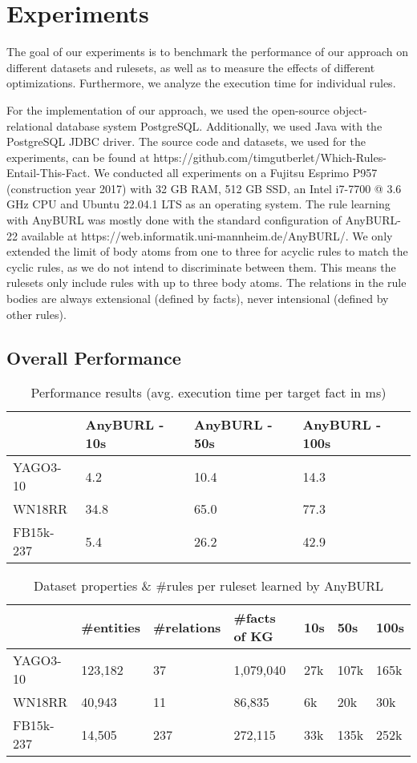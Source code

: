 \documentclass[english]{lni}
\begin{document}
\section{Experiments}
The goal of our experiments is to benchmark the performance of our approach on different datasets and rulesets, as well as to measure the effects of different optimizations. Furthermore, we analyze the execution time for individual rules. 

For the implementation of our approach, we used the open-source object-relational database system PostgreSQL. Additionally, we used Java with the PostgreSQL JDBC driver. The source code and datasets, we used for the experiments, can be found at https://github.com/timgutberlet/Which-Rules-Entail-This-Fact. We conducted all experiments on a Fujitsu Esprimo P957 (construction year 2017) with 32 GB RAM, 512 GB SSD, an Intel i7-7700 @ 3.6 GHz CPU and Ubuntu 22.04.1 LTS as an operating system. The rule learning with AnyBURL was mostly done with the standard configuration of AnyBURL-22 available at https://web.informatik.uni-mannheim.de/AnyBURL/. We only extended the limit of body atoms from one to three for acyclic rules to match the cyclic rules, as we do not intend to discriminate between them. This means the rulesets only include rules with up to three body atoms. The relations in the rule bodies are always extensional (defined by facts), never intensional (defined by other rules).

\subsection{Overall Performance}

\begin{table}[t]
\centering
\begin{tabular}{l|lll}
\toprule
 & AnyBURL - 10s & AnyBURL - 50s  & AnyBURL - 100s\\
\midrule
YAGO3-10 & 4.2 & 10.4 & 14.3\\
WN18RR & 34.8 & 65.0 & 77.3\\
FB15k-237 & 5.4 & 26.2 & 42.9\\
\bottomrule
\end{tabular}
\caption{Performance results (avg. execution time per target fact in ms)}
\label{tab:overall}
\end{table}

\begin{table}[t]
\centering
\begin{tabular}{l|lll|lll}
\toprule
 & \#entities & \#relations & \#facts of KG & 10s & 50s & 100s\\
\midrule
YAGO3-10 & 123,182 & 37 & 1,079,040 & 27k & 107k & 165k\\
WN18RR & 40,943 & 11 & 86,835 & 6k & 20k & 30k\\
FB15k-237 & 14,505 & 237 & 272,115 & 33k & 135k & 252k\\
\bottomrule
\end{tabular}
\caption{Dataset properties \& \#rules per ruleset learned by AnyBURL}
\label{tab:rules}
\end{table}
\end{document}
